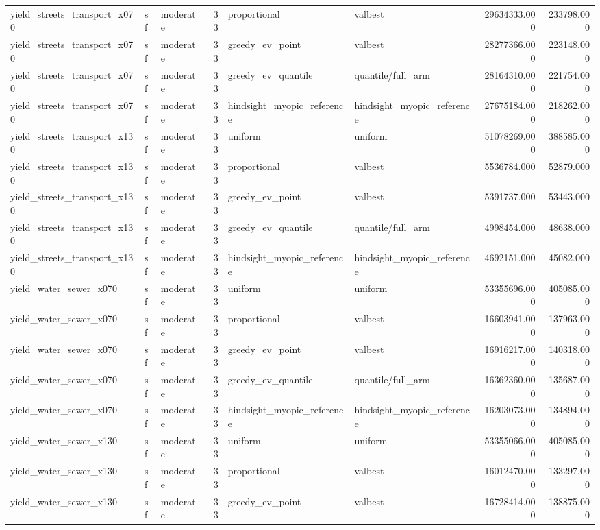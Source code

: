 \begin{tabular}{lllrllrr}
yield\_streets\_transport\_x070 & sf & moderate & 33 & proportional & valbest & 29634333.000 & 233798.000 \\
yield\_streets\_transport\_x070 & sf & moderate & 33 & greedy\_ev\_point & valbest & 28277366.000 & 223148.000 \\
yield\_streets\_transport\_x070 & sf & moderate & 33 & greedy\_ev\_quantile & quantile/full\_arm & 28164310.000 & 221754.000 \\
yield\_streets\_transport\_x070 & sf & moderate & 33 & hindsight\_myopic\_reference & hindsight\_myopic\_reference & 27675184.000 & 218262.000 \\
yield\_streets\_transport\_x130 & sf & moderate & 33 & uniform & uniform & 51078269.000 & 388585.000 \\
yield\_streets\_transport\_x130 & sf & moderate & 33 & proportional & valbest & 5536784.000 & 52879.000 \\
yield\_streets\_transport\_x130 & sf & moderate & 33 & greedy\_ev\_point & valbest & 5391737.000 & 53443.000 \\
yield\_streets\_transport\_x130 & sf & moderate & 33 & greedy\_ev\_quantile & quantile/full\_arm & 4998454.000 & 48638.000 \\
yield\_streets\_transport\_x130 & sf & moderate & 33 & hindsight\_myopic\_reference & hindsight\_myopic\_reference & 4692151.000 & 45082.000 \\
yield\_water\_sewer\_x070 & sf & moderate & 33 & uniform & uniform & 53355696.000 & 405085.000 \\
yield\_water\_sewer\_x070 & sf & moderate & 33 & proportional & valbest & 16603941.000 & 137963.000 \\
yield\_water\_sewer\_x070 & sf & moderate & 33 & greedy\_ev\_point & valbest & 16916217.000 & 140318.000 \\
yield\_water\_sewer\_x070 & sf & moderate & 33 & greedy\_ev\_quantile & quantile/full\_arm & 16362360.000 & 135687.000 \\
yield\_water\_sewer\_x070 & sf & moderate & 33 & hindsight\_myopic\_reference & hindsight\_myopic\_reference & 16203073.000 & 134894.000 \\
yield\_water\_sewer\_x130 & sf & moderate & 33 & uniform & uniform & 53355066.000 & 405085.000 \\
yield\_water\_sewer\_x130 & sf & moderate & 33 & proportional & valbest & 16012470.000 & 133297.000 \\
yield\_water\_sewer\_x130 & sf & moderate & 33 & greedy\_ev\_point & valbest & 16728414.000 & 138875.000 \\

\end{tabular}
